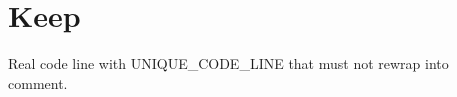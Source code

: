 \documentclass{article}
\begin{document}
\section{Keep}
Real code line with UNIQUE_CODE_LINE that must not rewrap into comment.
\end{document}
